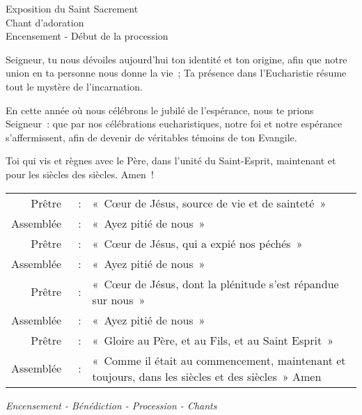 \begin{center}
\end{center}

Exposition du Saint Sacrement\\
Chant d'adoration\\
Encensement - Début de la procession



Seigneur, tu nous dévoiles aujourd’hui ton identité et ton origine, afin que notre union en ta personne nous donne la vie ; Ta présence dans l’Eucharistie résume tout le mystère de l’incarnation.

En cette année où nous célébrons le jubilé de l’espérance, nous te prions Seigneur : que par nos célébrations eucharistiques, notre foi et notre espérance s’affermissent, afin de devenir de véritables témoins de ton Evangile.

Toi qui vis et règnes avec le Père, dans l’unité du Saint-Esprit, maintenant et pour les siècles des siècles. Amen !



\begin{tabular}{rcp{10cm}}
Prêtre & : &		« Cœur de Jésus, source de vie et de sainteté » \\
Assemblée & : &	« Ayez pitié de nous » \\
Prêtre & : &		« Cœur de Jésus, qui a expié nos péchés » \\
Assemblée & : &	« Ayez pitié de nous » \\
Prêtre & : &		« Cœur de Jésus, dont la plénitude s’est répandue sur nous » \\
Assemblée & : &	« Ayez pitié de nous » \\
Prêtre & : &		« Gloire au Père, et au Fils, et au Saint Esprit » \\
Assemblée & : &	« Comme il était au commencement, maintenant et toujours, dans les siècles et des siècles » Amen  \\
\end{tabular}
\emph{Encensement - Bénédiction - Procession - Chants}


